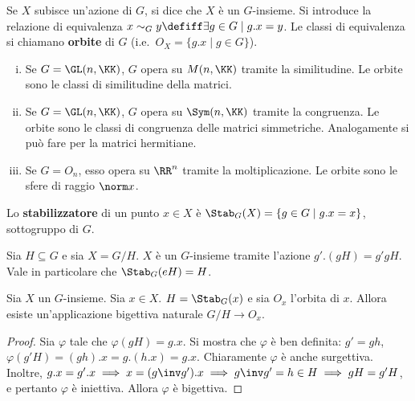 \documentclass[11pt]{article}
\begin{document}
	Se $X$ subisce un'azione di $G$, si dice che $X$ è un $G$-insieme.
	Si introduce la relazione di equivalenza $x \sim_G y \defiff \exists g \in G \mid g.x = y$. Le classi di equivalenza si chiamano \textbf{orbite}
	di $G$ (i.e.~$O_X = \{ g.x \mid g \in G \}$). \\
	
	\begin{example}
		\begin{enumerate}[(i)]
			\item Se $G = \GL(n, \KK)$, $G$ opera su $M(n, \KK)$ tramite
			la similitudine. Le orbite sono le classi di similitudine
			della matrici.
			
			\item Se $G = \GL(n, \KK)$, $G$ opera su $\Sym(n, \KK)$
			tramite la congruenza. Le orbite sono le classi di congruenza
			delle matrici simmetriche. Analogamente si può fare per la
			matrici hermitiane.
			
			\item Se $G = O_n$, esso opera su $\RR^n$ tramite la
			moltiplicazione. Le orbite sono le sfere di raggio $\norm x$.
		\end{enumerate}
	\end{example}

	\begin{definition}
		Lo \textbf{stabilizzatore} di un punto $x \in X$ è
		$\Stab_G(X) = \{g \in G \mid g.x = x \}$, sottogruppo
		di $G$.
	\end{definition}

	\begin{example}
		Sia $H \subseteq G$ e sia $X = G/H$. $X$ è un $G$-insieme
		tramite l'azione $g'.(gH) = g'gH$. Vale in particolare
		che $\Stab_G(eH) = H$.
	\end{example}

	\begin{proposition}
		Sia $X$ un $G$-insieme. Sia $x \in X$. $H = \Stab_G(x)$ e sia
		$O_x$ l'orbita di $x$. Allora esiste un'applicazione bigettiva
		naturale $G/H \to O_x$.
	\end{proposition}

	\begin{proof}
		Sia $\varphi$ tale che $\varphi(gH) = g.x$. Si mostra che
		$\varphi$ è ben definita: $g' = gh$, $\varphi(g'H) = (gh).x =
		g.(h.x) = g.x$. Chiaramente $\varphi$ è anche surgettiva.
		Inoltre, $g.x = g'.x \implies x = (g\inv g').x \implies g\inv g' = h \in H \implies gH = g'H$, e pertanto $\varphi$ è iniettiva.
		Allora $\varphi$ è bigettiva.
	\end{proof}
\end{document}
